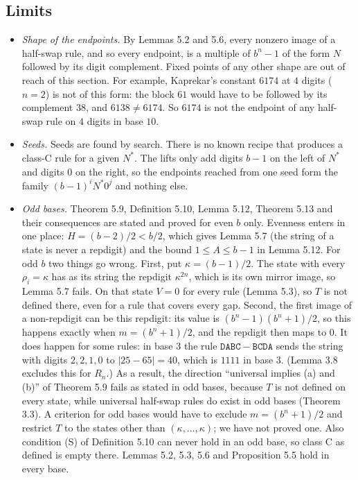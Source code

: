 \documentclass[11pt,letterpaper]{article}
\providecommand{\tightlist}{%
  \setlength{\itemsep}{0pt}\setlength{\parskip}{0pt}}
\theoremstyle{paperstyle}
\theoremstyle{paperstyledef}
\theoremstyle{paperstylerem}
\begin{document}
\subsection{Limits}\label{limits}

\begin{itemize}
\tightlist
\item
  \emph{Shape of the endpoints.} By Lemmas 5.2 and 5.6, every nonzero image of a half-swap rule, and so every endpoint, is a multiple of \(b^n - 1\) of the form \(N\) followed by its digit complement. Fixed points of any other shape are out of reach of this section. For example, Kaprekar's constant \(6174\) at \(4\) digits (\(n = 2\)) is not of this form: the block \(61\) would have to be followed by its complement \(38\), and \(6138 \ne 6174\). So \(6174\) is not the endpoint of any half-swap rule on \(4\) digits in base \(10\).
\item
  \emph{Seeds.} Seeds are found by search. There is no known recipe that produces a class-C rule for a given \(N^*\). The lifts only add digits \(b-1\) on the left of \(N^*\) and digits \(0\) on the right, so the endpoints reached from one seed form the family \((b-1)^i N^* 0^j\) and nothing else.
\item
  \emph{Odd bases.} Theorem 5.9, Definition 5.10, Lemma 5.12, Theorem 5.13 and their consequences are stated and proved for even \(b\) only. Evenness enters in one place: \(H = (b-2)/2 < b/2\), which gives Lemma 5.7 (the string of a state is never a repdigit) and the bound \(1 \le A \le b-1\) in Lemma 5.12. For odd \(b\) two things go wrong. First, put \(\kappa = (b-1)/2\). The state with every \(\rho_i = \kappa\) has as its string the repdigit \(\kappa^{2n}\), which is its own mirror image, so Lemma 5.7 fails. On that state \(V = 0\) for every rule (Lemma 5.3), so \(T\) is not defined there, even for a rule that covers every gap. Second, the first image of a non-repdigit can be this repdigit: its value is \((b^n - 1)(b^n + 1)/2\), so this happens exactly when \(m = (b^n + 1)/2\), and the repdigit then maps to \(0\). It does happen for some rules: in base \(3\) the rule \(\mathtt{DABC} - \mathtt{BCDA}\) sends the string with digits \(2, 2, 1, 0\) to \(|25 - 65| = 40\), which is \(1111\) in base \(3\). (Lemma 3.8 excludes this for \(R_n\).) As a result, the direction ``universal implies (a) and (b)'' of Theorem 5.9 fails as stated in odd bases, because \(T\) is not defined on every state, while universal half-swap rules do exist in odd bases (Theorem 3.3). A criterion for odd bases would have to exclude \(m = (b^n + 1)/2\) and restrict \(T\) to the states other than \((\kappa, \dots, \kappa)\); we have not proved one. Also condition (S) of Definition 5.10 can never hold in an odd base, so class C as defined is empty there. Lemmas 5.2, 5.3, 5.6 and Proposition 5.5 hold in every base.
\end{itemize}
\end{document}
